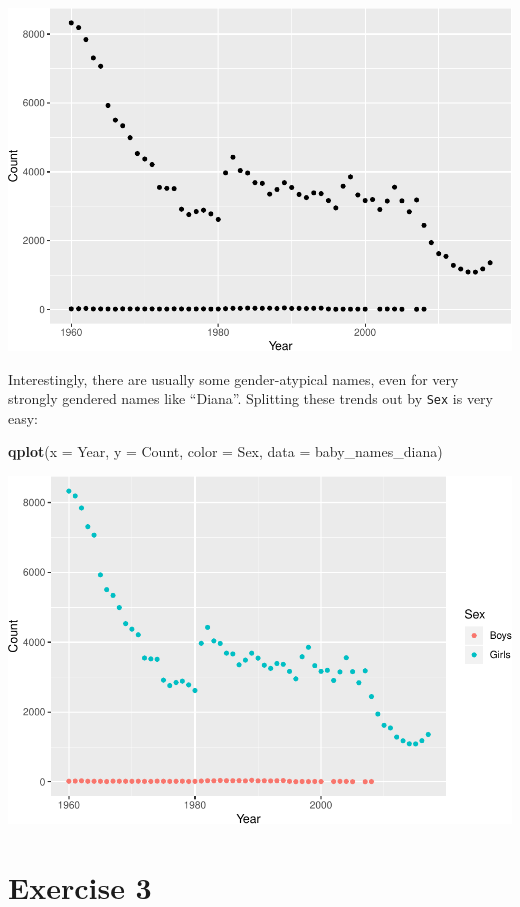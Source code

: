 \documentclass[]{book}
\newenvironment{Shaded}{\begin{snugshade}}{\end{snugshade}}
\newcommand{\DataTypeTok}[1]{\textcolor[rgb]{0.13,0.29,0.53}{#1}}
\newcommand{\KeywordTok}[1]{\textcolor[rgb]{0.13,0.29,0.53}{\textbf{#1}}}
\newcommand{\NormalTok}[1]{#1}
\begin{document}
\includegraphics{R/Rintro/figures/unnamed-chunk-28-1.pdf}

Interestingly, there are usually some gender-atypical names, even for very strongly
gendered names like ``Diana''. Splitting these trends out by \texttt{Sex} is very easy:

\begin{Shaded}
\begin{Highlighting}[]
\KeywordTok{qplot}\NormalTok{(}\DataTypeTok{x =}\NormalTok{ Year, }\DataTypeTok{y =}\NormalTok{ Count, }\DataTypeTok{color =}\NormalTok{ Sex,}
      \DataTypeTok{data =}\NormalTok{ baby_names_diana)}
\end{Highlighting}
\end{Shaded}

\includegraphics{R/Rintro/figures/unnamed-chunk-29-1.pdf}

\hypertarget{exercise-3}{%
\section{Exercise 3}\label{exercise-3}}
\end{document}
